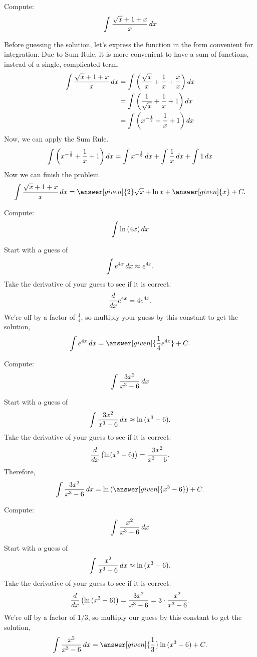 \documentclass{ximera}
\begin{document}
\begin{example}
Compute:
\[
\int \frac{\sqrt{x}+1+x}{x} \mathop{}\!d x
\]
\begin{explanation}
Before guessing the solution, let's express  the function in the form convenient for integration. Due to Sum Rule, it is more convenient to have a sum of functions, instead of a single, complicated term.
\begin{align*}
  \int \frac{\sqrt{x}+1+x}{x} \mathop{}\!d x &=\int \left(\frac{\sqrt{x}}{x}+\frac{1}{x}+\frac{x}{x}\right) \mathop{}\!d x\\
  &=\int \left(\frac{1}{\sqrt{x}}+\frac{1}{x}+1\right) \mathop{}\!d x\\
  &=\int \left(x^{-\frac{1}{2}}+\frac{1}{x}+1\right) \mathop{}\!d x
\end{align*}
Now, we can apply the Sum Rule.
\[
\int \left(x^{-\frac{1}{2}}+\frac{1}{x}+1\right) \mathop{}\!d x=\int x^{-\frac{1}{2}}\mathop{}\!d x+\int\frac{1}{x}\mathop{}\!d x+\int1 \mathop{}\!d x
\]
Now we can finish the problem.
\[
\int \frac{\sqrt{x}+1+x}{x} \d x= \answer[given]{2}\sqrt{x}+\ln{x}+ \answer[given]{x} + C.
\]
\end{explanation}
\end{example}
\begin{example}
  Compute:
  \[
  \int \ln{(4x)} \mathop{}\!d x
  \]
  \begin{explanation}
    Start with a guess of
    \[
    \int e^{4x} \mathop{}\!d x \approx e^{4x}.
    \]
    Take the derivative of your guess to see if it is correct:
    \[
    \frac{d}{\mathop{}\!d x}  e^{4x} = 4e^{4x}.
    \]
    We're off by a factor of $\frac{1}{4}$, so multiply your guess by this constant
    to get the solution,
    \[
  \int e^{4x} \d x = \answer[given]{\frac{1}{4} e^{4x}}+C.
    \]
\end{explanation}
\end{example}
\begin{example}
  Compute:
  \[
  \int \frac{3x^2}{x^3 -6} \mathop{}\!d x
  \]
  \begin{explanation}
    Start with a guess of
    \[
 \int \frac{3x^2}{x^3 -6} \mathop{}\!d x \approx \ln{(x^3 -6)}.
    \]
    Take the derivative of your guess to see if it is correct:
    \[
    \frac{d}{\mathop{}\!d x} \left(\ln(x^3-6)\right) = \frac{3x^2}{x^3-6}.
    \]
   Therefore,
    \[
    \int \frac{3x^2}{x^3 -6} \d x
 = \ln{(\answer[given]{x^3 -6})}+C.
    \]
\end{explanation}
\end{example}

\begin{example}
  Compute:
  \[
  \int \frac{x^2}{x^3 -6} \mathop{}\!d x
  \]
  \begin{explanation}
    Start with a guess of
    \[
 \int \frac{x^2}{x^3 -6} \mathop{}\!d x \approx \ln{(x^3 -6)}.
    \]
    Take the derivative of your guess to see if it is correct:
    \[
    \frac{d}{\mathop{}\!d x} \left(\ln{(x^3 -6)}\right) = \frac{3x^2}{x^3 -6} = 3\cdot \frac{x^2}{x^3-6}.
    \]
    We're off by a factor of $1/3$, so multiply our guess by this constant
    to get the solution,
    \[
    \int \frac{x^2}{x^3 -6} \d x
 = \answer[given]{\frac{1}{3}}\ln{(x^3 -6)}+C.
    \]
\end{explanation}
\end{example}
\end{document}

